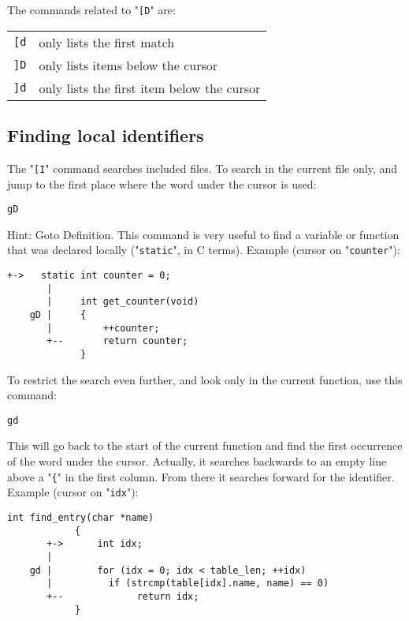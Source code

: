 The commands related to "\verb![D!" are:

\begin{center} \begin{tabular}{c l}
\verb![d! & only lists the first match \\
\verb!]D! & only lists items below the cursor \\
\verb!]d! & only lists the first item below the cursor \\
\end{tabular} \end{center}
\subsection{Finding local identifiers}
The "\verb![I!" command searches included files.
To search in the current file only, and jump to the first place where the word under the cursor is used:

\begin{Verbatim}[samepage=true]
 gD
\end{Verbatim}

Hint: Goto Definition.
This command is very useful to find a variable or function that was declared locally ("\verb!static!", in C terms).
Example (cursor on "\verb!counter!"):

\begin{Verbatim}[samepage=true]
       +->   static int counter = 0;
       |
       |     int get_counter(void)
    gD |     {
       |         ++counter;
       +--       return counter;
             }
\end{Verbatim}

To restrict the search even further, and look only in the current function, use this command:

\begin{Verbatim}[samepage=true]
 gd
\end{Verbatim}

This will go back to the start of the current function and find the first occurrence of the word under the cursor.
Actually, it searches backwards to an empty line above a "\verb!{!" in the first column.
From there it searches forward for the identifier.
Example (cursor on "\verb!idx!"):

\begin{Verbatim}[samepage=true]
            int find_entry(char *name)
            {
       +->      int idx;
       |
    gd |        for (idx = 0; idx < table_len; ++idx)
       |          if (strcmp(table[idx].name, name) == 0)
       +--             return idx;
            }
\end{Verbatim}
\clearpage
